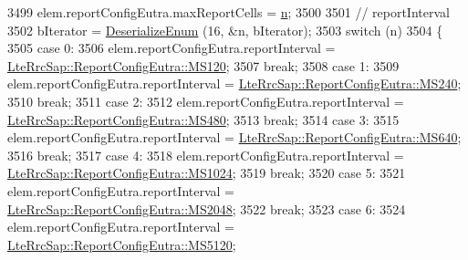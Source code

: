 \begin{DoxyCode}
3499               elem.reportConfigEutra.maxReportCells = \hyperlink{namespacesample-rng-plot_aeb5ee5c431e338ef39b7ac5431242e1d}{n};
3500 
3501               \textcolor{comment}{// reportInterval}
3502               bIterator = \hyperlink{classns3_1_1Asn1Header_a4fcc253e0eec3483c775b005c1875f2d}{DeserializeEnum} (16, &n, bIterator);
3503               \textcolor{keywordflow}{switch} (n)
3504                 \{
3505                 \textcolor{keywordflow}{case} 0:
3506                   elem.reportConfigEutra.reportInterval = 
      \hyperlink{structns3_1_1LteRrcSap_1_1ReportConfigEutra_aa04b2781a844eb212d59762829e41d31a589e66031e6df344b9cf90c323650e3a}{LteRrcSap::ReportConfigEutra::MS120};
3507                   \textcolor{keywordflow}{break};
3508                 \textcolor{keywordflow}{case} 1:
3509                   elem.reportConfigEutra.reportInterval = 
      \hyperlink{structns3_1_1LteRrcSap_1_1ReportConfigEutra_aa04b2781a844eb212d59762829e41d31a7426f1e7502aa2b643e3723b2ca5caaf}{LteRrcSap::ReportConfigEutra::MS240};
3510                   \textcolor{keywordflow}{break};
3511                 \textcolor{keywordflow}{case} 2:
3512                   elem.reportConfigEutra.reportInterval = 
      \hyperlink{structns3_1_1LteRrcSap_1_1ReportConfigEutra_aa04b2781a844eb212d59762829e41d31a62abaecf01626941b93ca2792987c8df}{LteRrcSap::ReportConfigEutra::MS480};
3513                   \textcolor{keywordflow}{break};
3514                 \textcolor{keywordflow}{case} 3:
3515                   elem.reportConfigEutra.reportInterval = 
      \hyperlink{structns3_1_1LteRrcSap_1_1ReportConfigEutra_aa04b2781a844eb212d59762829e41d31a581c9bf9b4ca5b30dab5d32c9fe56e3e}{LteRrcSap::ReportConfigEutra::MS640};
3516                   \textcolor{keywordflow}{break};
3517                 \textcolor{keywordflow}{case} 4:
3518                   elem.reportConfigEutra.reportInterval = 
      \hyperlink{structns3_1_1LteRrcSap_1_1ReportConfigEutra_aa04b2781a844eb212d59762829e41d31abf2b9417aacdfb7aecfaccca7a69969d}{LteRrcSap::ReportConfigEutra::MS1024};
3519                   \textcolor{keywordflow}{break};
3520                 \textcolor{keywordflow}{case} 5:
3521                   elem.reportConfigEutra.reportInterval = 
      \hyperlink{structns3_1_1LteRrcSap_1_1ReportConfigEutra_aa04b2781a844eb212d59762829e41d31a837db6ef715f96858f5354f16ccd3bdd}{LteRrcSap::ReportConfigEutra::MS2048};
3522                   \textcolor{keywordflow}{break};
3523                 \textcolor{keywordflow}{case} 6:
3524                   elem.reportConfigEutra.reportInterval = 
      \hyperlink{structns3_1_1LteRrcSap_1_1ReportConfigEutra_aa04b2781a844eb212d59762829e41d31a6a1c42a79ea22b1e24a6e2327f358e5c}{LteRrcSap::ReportConfigEutra::MS5120};

\end{DoxyCode}
